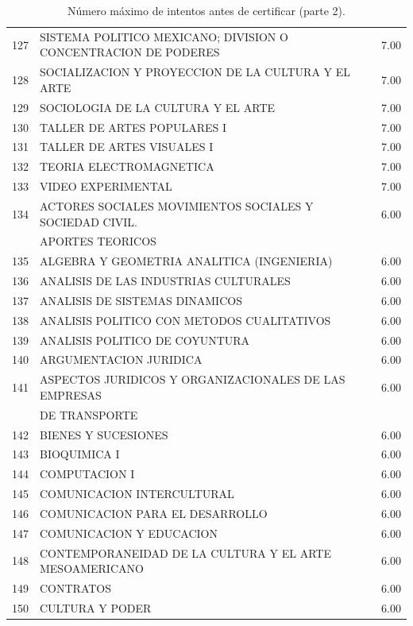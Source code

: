 \documentclass[12pt]{article}
\begin{document}
\begin{table}[ht]
{\begin{tabular}{rlr}
  127 & SISTEMA POLITICO MEXICANO; DIVISION O CONCENTRACION DE PODERES & 7.00 \\ 
  128 & SOCIALIZACION Y PROYECCION DE LA CULTURA Y EL ARTE & 7.00 \\ 
  129 & SOCIOLOGIA DE LA CULTURA Y EL ARTE & 7.00 \\ 
  130 & TALLER DE ARTES POPULARES I & 7.00 \\ 
  131 & TALLER DE ARTES VISUALES I & 7.00 \\ 
  132 & TEORIA ELECTROMAGNETICA & 7.00 \\ 
  133 & VIDEO EXPERIMENTAL & 7.00 \\ 
  134 & ACTORES SOCIALES MOVIMIENTOS SOCIALES Y SOCIEDAD CIVIL. & 6.00 \\ 
  &  APORTES TEORICOS &  \\ 
  135 & ALGEBRA Y GEOMETRIA ANALITICA (INGENIERIA) & 6.00 \\ 
  136 & ANALISIS DE LAS INDUSTRIAS CULTURALES & 6.00 \\ 
  137 & ANALISIS DE SISTEMAS DINAMICOS & 6.00 \\ 
  138 & ANALISIS POLITICO CON METODOS CUALITATIVOS & 6.00 \\ 
  139 & ANALISIS POLITICO DE COYUNTURA & 6.00 \\ 
  140 & ARGUMENTACION JURIDICA & 6.00 \\ 
  141 & ASPECTOS JURIDICOS Y ORGANIZACIONALES DE LAS EMPRESAS& 6.00 \\ 
   & DE TRANSPORTE & \\ 
  142 & BIENES Y SUCESIONES & 6.00 \\ 
  143 & BIOQUIMICA I & 6.00 \\ 
  144 & COMPUTACION I & 6.00 \\ 
  145 & COMUNICACION INTERCULTURAL & 6.00 \\ 
  146 & COMUNICACION PARA EL DESARROLLO & 6.00 \\ 
  147 & COMUNICACION Y EDUCACION & 6.00 \\ 
  148 & CONTEMPORANEIDAD DE LA CULTURA Y EL ARTE MESOAMERICANO & 6.00 \\ 
  149 & CONTRATOS & 6.00 \\ 
  150 & CULTURA Y PODER & 6.00 \\ 
   \hline
\end{tabular}}
\caption{\label{Num_Max_Intentos_Cert_2} N\'umero m\'aximo de intentos antes de certificar (parte 2).}
\end{table}
\end{document}
